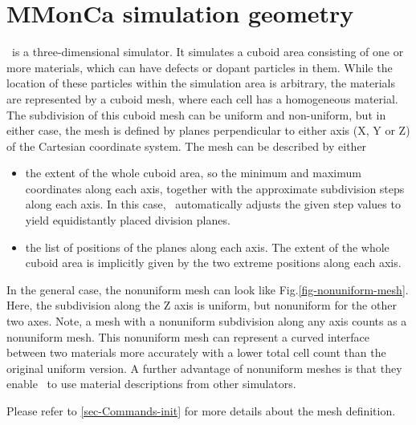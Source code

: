 \section{MMonCa simulation geometry}

\MMonCa\ is a three-dimensional simulator. It simulates a cuboid area consisting of one or more materials, which can have defects or dopant particles in them. While the location of these particles within the simulation area is arbitrary, the materials are represented by a cuboid mesh, where each cell has a homogeneous material. The subdivision of this cuboid mesh can be uniform and non-uniform, but in either case, the mesh is defined by planes perpendicular to either axis (X, Y or Z) of the Cartesian coordinate system. The mesh can be described by either

\begin{itemize}
  \item the extent of the whole cuboid area, so the minimum and maximum coordinates along each axis, together with the approximate subdivision steps along each axis. In this case, \MMonCa\ automatically adjusts the given step values to yield equidistantly placed division planes.
  \item the list of positions of the planes along each axis. The extent of the whole cuboid area is implicitly given by the two extreme positions along each axis.
\end{itemize}

In the general case, the nonuniform mesh can look like Fig.\ref{fig-nonuniform-mesh}. Here, the subdivision along the Z axis is uniform, but nonuniform for the other two axes. Note, a mesh with a nonuniform subdivision along any axis counts as a nonuniform mesh. This nonuniform mesh can represent a curved interface between two materials more accurately with a lower total cell count than the original uniform version. A further advantage of nonuniform meshes is that they enable \MMonCa\ to use material descriptions from other simulators.

Please refer to \ref{sec-Commands-init} for more details about the mesh definition.

